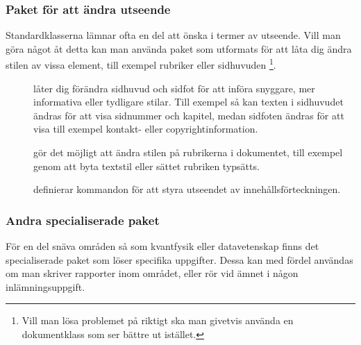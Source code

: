 \documentclass[../../latex.tex]{subfiles}
\begin{document}
\subsubsection{Paket för att ändra utseende}
Standardklasserna lämnar ofta en del att önska i termer av utseende. Vill
man göra något åt detta kan man använda paket som utformats för att låta
dig ändra stilen av vissa element, till exempel rubriker eller sidhuvuden%
\footnote{Vill man lösa problemet på riktigt ska man givetvis använda en
dokumentklass som ser bättre ut istället.}.

\begin{description}
	\item[]
	låter dig förändra sidhuvud och sidfot för att införa snyggare, mer
	informativa eller tydligare stilar. Till exempel så kan texten i
	sidhuvudet ändras för att visa sidnummer och kapitel, medan sidfoten
	ändras för att visa till exempel kontakt- eller copyrightinformation.
	
	\item[]
	gör det möjligt att ändra stilen på rubrikerna i dokumentet, till
	exempel genom att byta textstil eller sättet rubriken typsätts.

	\item[]
	definierar kommandon för att styra utseendet av
	innehållsförteckningen.
\end{description}

\subsubsection{Andra specialiserade paket}
För en del snäva områden så som kvantfysik eller datavetenskap finns det
specialiserade paket som löser specifika uppgifter. Dessa kan med fördel
användas om man skriver rapporter inom området, eller rör vid ämnet i
någon inlämningsuppgift.
\end{document}
